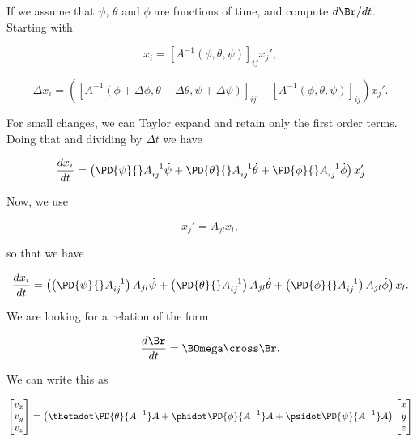 If we assume that $\psi$, $\theta$ and $\phi$ are functions of time, and compute $d \Br/dt$.  Starting with

\begin{equation}\label{eqn:classicalMechanicsEulerAngles:300}
x_i = [A^{-1}(\phi, \theta, \psi)]_{ij} x_j',
\end{equation}


\begin{equation}\label{eqn:classicalMechanicsEulerAngles:320}
\Delta x_i = 
\left(
[A^{-1}(\phi + \Delta \phi, \theta + \Delta \theta, \psi + \Delta \psi)]_{ij} 
-[A^{-1}(\phi, \theta, \psi)]_{ij} 
\right)
x_j'.
\end{equation}

For small changes, we can Taylor expand and retain only the first order terms.  Doing that and dividing by $\Delta t$ we have

\begin{equation}\label{eqn:classicalMechanicsEulerAngles:340}
\frac{d x_i}{dt} =
\left(
\PD{\psi}{} A^{-1}_{ij} \dot{\psi}
+\PD{\theta}{} A^{-1}_{ij} \dot{\theta}
+\PD{\phi}{} A^{-1}_{ij} \dot{\phi}
\right) x_j'
\end{equation}

Now, we use

\begin{equation}\label{eqn:classicalMechanicsEulerAngles:360}
x_j' = A_{jl} x_l,
\end{equation}

so that we have

\begin{equation}\label{eqn:classicalMechanicsEulerAngles:380}
\frac{d x_i}{dt} =
\left(
\left(\PD{\psi}{} A^{-1}_{ij} \right) A_{jl} \dot{\psi}
+\left(\PD{\theta}{} A^{-1}_{ij} \right) A_{jl} \dot{\theta}
+\left(\PD{\phi}{} A^{-1}_{ij} \right) A_{jl} \dot{\phi}
\right) x_l.
\end{equation}

We are looking for a relation of the form

\begin{equation}\label{eqn:classicalMechanicsEulerAngles:400}
\frac{d\Br}{dt} = \BOmega \cross \Br.
\end{equation}

We can write this as

\begin{equation}\label{eqn:classicalMechanicsEulerAngles:420}
\begin{bmatrix}
v_x \\
v_y \\
v_z
\end{bmatrix} 
=
\left(
\thetadot \PD{\theta}{A^{-1}} A
+\phidot \PD{\phi}{A^{-1}} A
+\psidot \PD{\psi}{A^{-1}} A
\right)
\begin{bmatrix}
x \\
y \\
z
\end{bmatrix} 
\end{equation}

